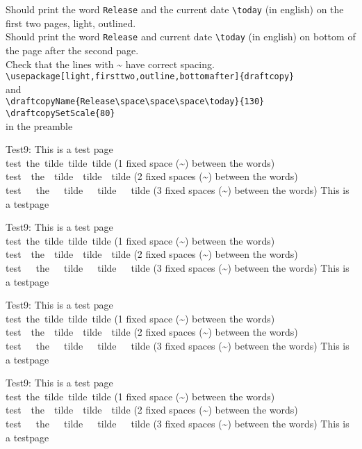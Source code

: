 \documentclass{article}
\newcommand{\xx}{
Test9: This is a test page \thepage\\
test~the~tilde~tilde~tilde (1 fixed space (\~{})  between the words)\\
test~~the~~tilde~~tilde~~tilde (2 fixed spaces (\~{}) between the words)\\
test~~~the~~~tilde~~~tilde~~~tilde (3 fixed spaces (\~{}) between the words)
\vfill
This is a testpage \thepage \newpage
}
\begin{document}
Should print the word \verb+Release+  and the current date \verb|\today|
(in english) on the first two pages, light, outlined.\\
Should print the word \verb+Release+  and current date \verb|\today|
(in english) on bottom of the page after the second page.\\
Check that the lines with \~{} have correct spacing.\\
\verb|\usepackage[light,firsttwo,outline,bottomafter]{draftcopy}|\\
and \\
\verb|\draftcopyName{Release\space\space\space\today}{130}|\\
\verb|\draftcopySetScale{80}|\\
in the preamble
\xx\xx\xx\xx
\end{document}
